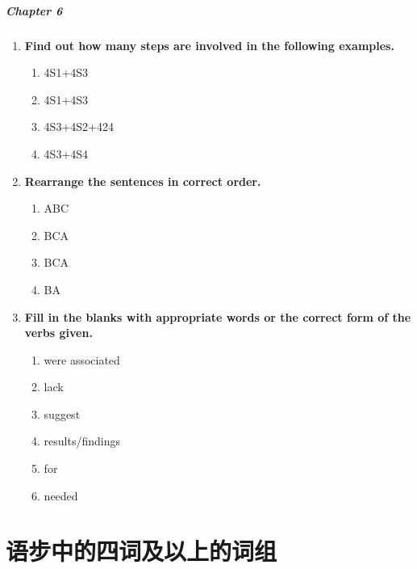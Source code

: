 \documentclass[a4paper]{ctexbook}
\begin{document}
\paragraph*{Chapter 6}\par
\begin{enumerate}
  \item \textbf{Find out how many steps are involved in the following examples.}
  \begin{enumerate}
    \item 4S1+4S3
    \item 4S1+4S3
    \item 4S3+4S2+424
    \item 4S3+4S4
  \end{enumerate}

  \item \textbf{Rearrange the sentences in correct order.}
  \begin{enumerate}
    \item ABC
    \item BCA
    \item BCA
    \item BA
  \end{enumerate}

  \item \textbf{Fill in the blanks with appropriate words or the correct form of the verbs given.}
  \begin{enumerate}
    \item were associated
    \item lack
    \item suggest
    \item results/findings
    \item for
    \item needed
  \end{enumerate}
\end{enumerate}


\appendix

\chapter{语步中的四词及以上的词组}
\end{document}
